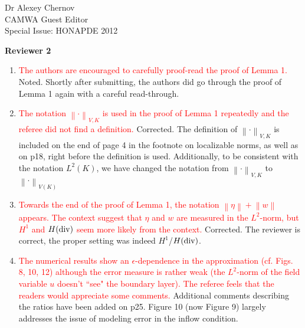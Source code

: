 \documentclass{letter}
\newcommand{\nor}[1]{\left\| #1 \right\|}
\begin{document}
\begin{letter}{Dr Alexey Chernov\\CAMWA Guest Editor\\Special Issue: HONAPDE 2012}
\begin{enumerate}
\end{enumerate}

\textbf{Reviewer 2}

%

\begin{enumerate}
\item \textcolor{red}{The authors are encouraged to carefully proof-read the proof of Lemma 1.}  Noted.  Shortly after submitting, the authors did go through the proof of Lemma 1 again with a careful read-through.
\item \textcolor{red}{The notation $\nor{\cdot}_{V,K}$ is used in the proof of Lemma 1 repeatedly and the referee did not find a definition.}  Corrected.  The definition of $\nor{\cdot}_{V,K}$ is included on the end of page 4 in the footnote on localizable norms, as well as on p18, right before the definition is used.  Additionally, to be consistent with the notation $L^2(K)$, we have changed the notation from $\nor{\cdot}_{V,K}$ to $\nor{\cdot}_{V(K)}$ 
\item \textcolor{red}{Towards the end of the proof of Lemma 1, the notation $\nor{\eta} + \nor{w}$ appears. The context suggest that $\eta$ and $w$ are measured in the $L^2$-norm, but $H^1$ and $H({\rm div})$ seem more likely from the context.}  Corrected.  The reviewer is correct, the proper setting was indeed $H^1$/$H({\rm div})$.  
\item \textcolor{red}{The numerical results show an $\epsilon$-dependence in the approximation (cf. Figs. 8, 10, 12) although the error measure is rather weak (the $L^2$-norm of the field variable $u$ doesn't ``see" the boundary layer). The referee feels that the readers would appreciate some comments.}  Additional comments describing the ratios have been added on p25.  Figure 10 (now Figure 9) largely addresses the issue of modeling error in the inflow condition.  


\end{enumerate}
\end{letter}
\end{document}
